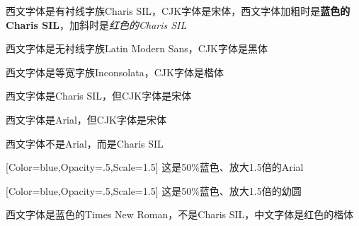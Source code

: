 \documentclass{article}
\begin{document}
西文字体是有衬线字族Charis SIL，CJK字体是宋体，西文字体加粗时是\textbf{蓝色的Charis SIL}，加斜时是\textit{红色的Charis SIL}

{\sffamily 西文字体是无衬线字族Latin Modern Sans，CJK字体是黑体}

{\ttfamily 西文字体是等宽字族Inconsolata，CJK字体是楷体}

\hrulefill

西文字体是Charis SIL，但CJK字体是宋体


{\arial 西文字体是Arial，但CJK字体是宋体}

{\rmfamily 西文字体不是Arial，而是Charis SIL}

\hrulefill

{[Color=blue,Opacity=.5,Scale=1.5]
这是50\%蓝色、放大1.5倍的Arial}

{[Color=blue,Opacity=.5,Scale=1.5]
这是50\%蓝色、放大1.5倍的幼圆}

\hrulefill

\setmonofont{Times New Roman}
{\ttfamily{} 西文字体是蓝色的Times New Roman，不是Charis SIL，中文字体是红色的楷体}
\end{document}
